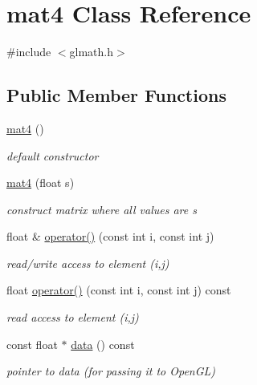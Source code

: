 \hypertarget{classmat4}{}\section{mat4 Class Reference}
\label{classmat4}


{\ttfamily \#include $<$glmath.\+h$>$}

\subsection*{Public Member Functions}
\begin{DoxyCompactItemize}
\item 
\hyperlink{classmat4_acf3f0c37ff5c16e8fb1bfdde2bf87a0f}{mat4} ()
\begin{DoxyCompactList}\small\item\em default constructor \end{DoxyCompactList}\item 
\hyperlink{classmat4_a5efcc4068d4350693982154b0decadc5}{mat4} (float s)
\begin{DoxyCompactList}\small\item\em construct matrix where all values are s \end{DoxyCompactList}\item 
float \& \hyperlink{classmat4_a4fd514a46e9cd9e8713456fd5be85e54}{operator()} (const int i, const int j)
\begin{DoxyCompactList}\small\item\em read/write access to element (i,j) \end{DoxyCompactList}\item 
float \hyperlink{classmat4_ade8b8e621a1c42c0d16a898a011414d6}{operator()} (const int i, const int j) const 
\begin{DoxyCompactList}\small\item\em read access to element (i,j) \end{DoxyCompactList}\item 
const float $\ast$ \hyperlink{classmat4_ae20da4790967e26646d42b4f99a271bb}{data} () const 
\begin{DoxyCompactList}\small\item\em pointer to data (for passing it to Open\+GL) \end{DoxyCompactList}\end{DoxyCompactItemize}
